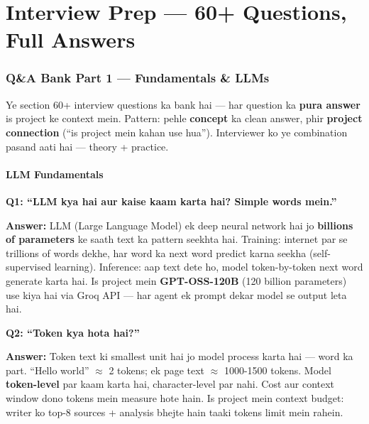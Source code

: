 \newpage

\part{Interview Prep --- 60+ Questions, Full Answers}

\section{Q\&A Bank Part 1 --- Fundamentals \& LLMs}

\begin{storybox}
Ye section 60+ interview questions ka bank hai --- har question ka \textbf{pura answer} is project ke context mein. Pattern: pehle \textbf{concept} ka clean answer, phir \textbf{project connection} (``is project mein kahan use hua''). Interviewer ko ye combination pasand aati hai --- theory + practice.
\end{storybox}

\subsection{LLM Fundamentals}

\begin{interviewbox}
\textbf{Q1: ``LLM kya hai aur kaise kaam karta hai? Simple words mein.''}

\textbf{Answer:} LLM (Large Language Model) ek deep neural network hai jo \textbf{billions of parameters} ke saath text ka pattern seekhta hai. Training: internet par se trillions of words dekhe, har word ka next word predict karna seekha (self-supervised learning). Inference: aap text dete ho, model token-by-token next word generate karta hai. Is project mein \textbf{GPT-OSS-120B} (120 billion parameters) use kiya hai via Groq API --- har agent ek prompt dekar model se output leta hai.
\end{interviewbox}

\begin{interviewbox}
\textbf{Q2: ``Token kya hota hai?''}

\textbf{Answer:} Token text ki smallest unit hai jo model process karta hai --- word ka part. ``Hello world'' $\approx$ 2 tokens; ek page text $\approx$ 1000-1500 tokens. Model \textbf{token-level} par kaam karta hai, character-level par nahi. Cost aur context window dono tokens mein measure hote hain. Is project mein context budget: writer ko top-8 sources + analysis bhejte hain taaki tokens limit mein rahein.
\end{interviewbox}


